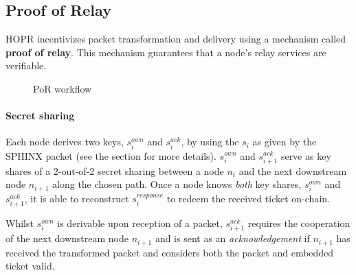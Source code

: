 \subsection{Proof of Relay}
\label{sec:incentives:proofofrelay}

HOPR incentivizes packet transformation and delivery using a mechanism called \textbf{proof of relay}. This mechanism guarantees that a node's relay services are verifiable.

\begin{figure}[H]
      \centering
      \caption{PoR workflow}
\end{figure}
\paragraph{Secret sharing}
\label{sec:incentives:proofofrelay:secretSharing}

Each node derives two keys, $s_i^{own}$ and $s_i^{ack}$, by using the $s_i$ as given by the SPHINX packet (see the  section for more details). $s_i^{own}$ and $s_{i+1}^{ack}$ serve as key shares of a 2-out-of-2 secret sharing between a node $n_i$ and the next downstream node $n_{i+1}$ along the chosen path. Once a node knows \textit{both} key shares, $s_i^{own}$ and $s_{i+1}^{ack}$, it is able to reconstruct $s_i^{response}$ to redeem the received ticket on-chain.

Whilst $s_i^{own}$ is derivable upon reception of a packet, $s_{i+1}^{ack}$ requires the cooperation of the next downstream node $n_{i+1}$ and is sent as an \textit{acknowledgement} if $n_{i+1}$ has received the transformed packet and considers both the packet and embedded ticket valid.


